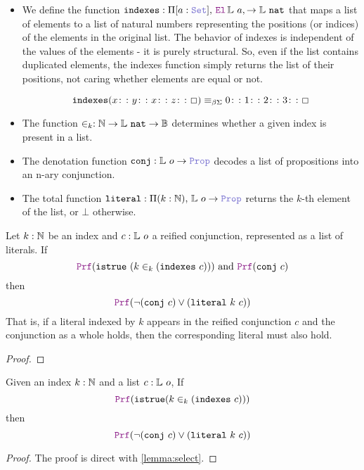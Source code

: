 \begin{itemize}
  \item We define the function $\kw{indexes}: \Pi [a: \set],\, \el\,\bb{L}~a, \ra \bb{L}~\kw{nat}$ that maps a list of elements
  to a list of natural numbers representing the positions (or indices) of the elements in the original list.
  The behavior of indexes is independent of the values of the elements - it is purely structural.
  So, even if the list contains duplicated elements, the indexes function simply returns the list of their positions, not caring whether elements are equal or not.

  \begin{example}[indexes]
  \[
  \mathop{\mathtt{indexes}} (x \colon\colon y \colon\colon x  \colon\colon z \colon\colon \Box) \equiv_{\beta\Sigma} 0 \colon\colon 1 \colon\colon 2 \colon\colon 3 \colon\colon \Box
  \]
  \end{example}
  \item The function $\in_k : \mathbb{N} \rightarrow \mathbb{L}~\texttt{\upshape{nat}} \rightarrow \mathbb{B}$  determines whether a given index is present in a list.
  \item The denotation function $\kw{conj}: \bb{L}~o \ra \prop$ decodes a list of propositions into an n-ary conjunction.
  \item The total function $\kw{literal}: \Pi (k: \N),\, \bb{L}~o \ra \prop$ returns the $k$-th element of the list, or $\bot$ otherwise.
\end{itemize}


\begin{lemma}[select]
Let $k : \mathbb{N}$ be an index and $c : \mathbb{L}~o$ a reified conjunction, represented as a list of literals. If
\[
  \prf (\kw{istrue}~(k \in_k (\kw{indexes}~c))) \text{ and } \prf (\kw{conj}~c)
\]
then
\[
  \prf (\neg (\kw{conj}~c) \lor (\kw{literal}~k~c))
\]
That is, if a literal indexed by $k$ appears in the reified conjunction $c$ and the conjunction as a whole holds, then the corresponding literal must also hold.
\label{lemma:select}
\begin{proof}
\end{proof}
\end{lemma}

\begin{lemma}
Given an index $k: \mathbb{N}$ and a list $c: \mathbb{L}~o$, If
\[
  \prf (\kw{istrue} (k \in_k (\kw{indexes}~c)))
\]
then
\[
  \prf (\neg (\kw{conj}~c) \lor (\kw{literal}~k~c))
\]
\begin{proof}
The proof is direct with \cref{lemma:select}.
\end{proof}
\label{lem:and-pos}
\end{lemma}



